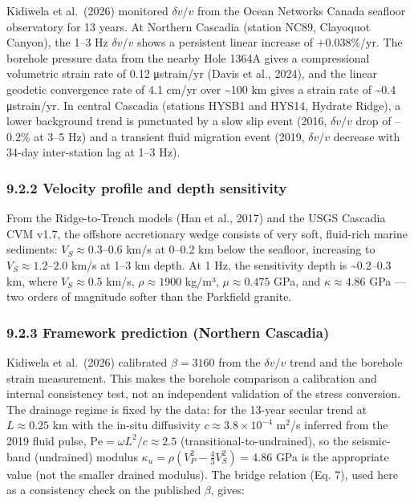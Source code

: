 \documentclass[12pt]{article}
\begin{document}
Kidiwela et al.~(2026) monitored \(\delta v/v\) from the Ocean Networks
Canada seafloor observatory for 13 years. At Northern Cascadia (station
NC89, Clayoquot Canyon), the 1--3 Hz \(\delta v/v\) shows a persistent
linear increase of \(+0.038\%\)/yr. The borehole pressure data from the
nearby Hole 1364A gives a compressional volumetric strain rate of 0.12
μstrain/yr (Davis et al., 2024), and the linear geodetic convergence
rate of 4.1 cm/yr over \textasciitilde100 km gives a strain rate of
\textasciitilde0.4 μstrain/yr. In central Cascadia (stations HYSB1 and
HYS14, Hydrate Ridge), a lower background trend is punctuated by a slow
slip event (2016, \(\delta v/v\) drop of --0.2\% at 3--5 Hz) and a
transient fluid migration event (2019, \(\delta v/v\) decrease with
34-day inter-station lag at 1--3 Hz).

\subsubsection{9.2.2 Velocity profile and depth
sensitivity}\label{velocity-profile-and-depth-sensitivity-1}

From the Ridge-to-Trench models (Han et al., 2017) and the USGS Cascadia
CVM v1.7, the offshore accretionary wedge consists of very soft,
fluid-rich marine sediments: \(V_S \approx 0.3\)--\(0.6\) km/s at 0--0.2
km below the seafloor, increasing to \(V_S \approx 1.2\)--\(2.0\) km/s
at 1--3 km depth. At 1 Hz, the sensitivity depth is
\textasciitilde0.2--0.3 km, where \(V_S \approx 0.5\) km/s,
\(\rho \approx 1900\) kg/m³, \(\mu \approx 0.475\) GPa, and
\(\kappa \approx 4.86\) GPa --- two orders of magnitude softer than the
Parkfield granite.

\subsubsection{9.2.3 Framework prediction (Northern
Cascadia)}\label{framework-prediction-northern-cascadia}

Kidiwela et al.~(2026) calibrated \(\beta = 3160\) from the
\(\delta v/v\) trend and the borehole strain measurement. This makes the
borehole comparison a calibration and internal consistency test, not an
independent validation of the stress conversion. The drainage regime is
fixed by the data: for the 13-year secular trend at \(L\approx 0.25\) km
with the in-situ diffusivity \(c\approx 3.8\times10^{-4}\) m\(^2\)/s
inferred from the 2019 fluid pulse,
\(\mathrm{Pe}=\omega L^2/c \approx 2.5\) (transitional-to-undrained), so
the seismic-band (undrained) modulus
\(\kappa_u = \rho(V_P^2-\tfrac{4}{3}V_S^2) = 4.86\) GPa is the
appropriate value (not the smaller drained modulus). The bridge relation
(Eq. 7), used here as a consistency check on the published \(\beta\),
gives:
\end{document}
